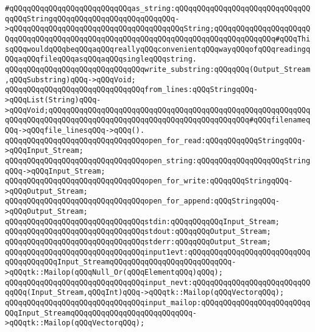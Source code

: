 \verb|#qQQqqQQqqQQqqQQqqQQqqQQqqQQqas_string:qQQqqQQqqQQqqQQqqQQqqQQqqQQqqQQqqQQqStringqQQqqQQqqQQqqQQqqQQqqQQqqQQq->qQQqqQQqqQQqqQQqqQQqqQQqqQQqqQQqqQQqqQQqString;qQQqqQQqqQQqqQQqqQQqqQQqqQQqqQQqqQQqqQQqqQQqqQQqqQQqqQQqqQQqqQQqqQQqqQQqqQQqqQQqqQQq#qQQqThisqQQqwouldqQQqbeqQQqaqQQqreallyqQQqconvenientqQQqwayqQQqofqQQqreadingqQQqaqQQqfileqQQqasqQQqaqQQqsingleqQQqstring.|\newline
\verb|qQQqqQQqqQQqqQQqqQQqqQQqqQQqqQQqwrite_substring:qQQqqQQq(Output_Stream,qQQqSubstring)qQQq->qQQqVoid;|\newline
\newline
\verb|qQQqqQQqqQQqqQQqqQQqqQQqqQQqqQQqfrom_lines:qQQqStringqQQq->qQQqList(String)qQQq->qQQqVoid;qQQqqQQqqQQqqQQqqQQqqQQqqQQqqQQqqQQqqQQqqQQqqQQqqQQqqQQqqQQqqQQqqQQqqQQqqQQqqQQqqQQqqQQqqQQqqQQqqQQqqQQqqQQqqQQqqQQq#qQQqfilenameqQQq->qQQqfile_linesqQQq->qQQq().|\newline
\newline
\verb|qQQqqQQqqQQqqQQqqQQqqQQqqQQqqQQqopen_for_read:qQQqqQQqqQQqStringqQQq->qQQqInput_Stream;|\newline
\verb|qQQqqQQqqQQqqQQqqQQqqQQqqQQqqQQqopen_string:qQQqqQQqqQQqqQQqqQQqStringqQQq->qQQqInput_Stream;|\newline
\newline
\verb|qQQqqQQqqQQqqQQqqQQqqQQqqQQqqQQqopen_for_write:qQQqqQQqStringqQQq->qQQqOutput_Stream;|\newline
\verb|qQQqqQQqqQQqqQQqqQQqqQQqqQQqqQQqopen_for_append:qQQqStringqQQq->qQQqOutput_Stream;|\newline
\newline
\verb|qQQqqQQqqQQqqQQqqQQqqQQqqQQqqQQqstdin:qQQqqQQqqQQqInput_Stream;|\newline
\verb|qQQqqQQqqQQqqQQqqQQqqQQqqQQqqQQqstdout:qQQqqQQqOutput_Stream;|\newline
\verb|qQQqqQQqqQQqqQQqqQQqqQQqqQQqqQQqstderr:qQQqqQQqOutput_Stream;|\newline
\newline
\verb|qQQqqQQqqQQqqQQqqQQqqQQqqQQqqQQqinput1evt:qQQqqQQqqQQqqQQqqQQqqQQqqQQqqQQqqQQqqQQqInput_StreamqQQqqQQqqQQqqQQqqQQqqQQqqQQq->qQQqtk::Mailop(qQQqNull_Or(qQQqElementqQQq)qQQq);|\newline
\verb|qQQqqQQqqQQqqQQqqQQqqQQqqQQqqQQqinput_nevt:qQQqqQQqqQQqqQQqqQQqqQQqqQQqqQQq(Input_Stream,qQQqInt)qQQq->qQQqtk::Mailop(qQQqVectorqQQq);|\newline
\verb|qQQqqQQqqQQqqQQqqQQqqQQqqQQqqQQqinput_mailop:qQQqqQQqqQQqqQQqqQQqqQQqqQQqInput_StreamqQQqqQQqqQQqqQQqqQQqqQQqqQQq->qQQqtk::Mailop(qQQqVectorqQQq);|\newline
